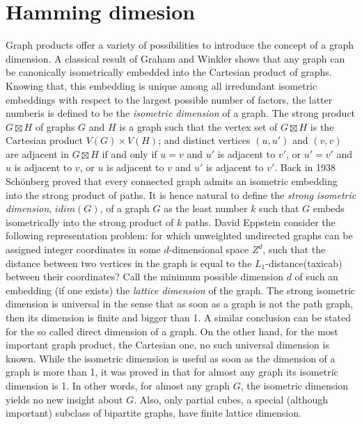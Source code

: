 \documentclass[12pt,a4paper,titlepage,openany]{report}
\begin{document}
\chapter{Hamming dimesion}
Graph products offer a variety of possibilities to introduce the concept of a graph dimension. A classical result of Graham and Winkler \cite{Graham} shows that any graph can be canonically isometrically embedded into the Cartesian product of graphs. Knowing that, this embedding is unique among all irredundant isometric embeddings with respect to the largest possible number of factors, the latter numberis is defined to be the \textit{isometric dimension} of a graph. 
\newline The strong product $G\boxtimes H$ of graphs $G$ and $H$ is a graph such that the vertex set of $G\boxtimes H$ is the Cartesian product $V(G) \times V(H)$; and distinct vertices $(u,u')$ and $(v,v)$ are adjacent in $G\boxtimes  H$ if and only if $u = v$ and $u'$ is adjacent to $v'$, or $u' = v'$ and $u$ is adjacent to $v$, or $u$ is adjacent to $v$ and $u'$ is adjacent to $v'$. Back in 1938 Sch\" onberg \cite{Schonber} proved that every connected graph admits an isometric embedding into the strong product of paths. It is hence natural to define the \textit{strong isometric dimension}, $idim(G)$, of a graph $G$ as the least number $k$ such that $G$ embeds isometrically into the strong product of $k$ paths.\newline
David Eppstein consider the following representation problem: for which unweighted undirected graphs can be assigned integer coordinates in some $d$-dimensional space $Z^d$, such that the distance between two vertices in the graph is equal to the $L_1$-distance(taxicab) between their coordinates? Call the minimum possible dimension $d$ of such an embedding (if one exists) the \textit{lattice dimension} of the graph.\newline
The strong isometric dimension is universal in the sense that as soon as a graph is not the path graph, then its dimension is finite and bigger than 1. A similar conclusion can be stated for the so called direct dimension of a graph. On the other hand, for the most important graph product, the Cartesian one, no such universal dimension is known. While the isometric dimension is useful as soon as the dimension of a graph is more than 1, it was proved in \cite{Poljak} that for almost any graph its isometric dimension is 1. In
other words, for almost any graph $G$, the isometric dimension yields no new insight about $G$. Also, only
partial cubes, a special (although important) subclass of bipartite graphs, have finite lattice dimension.\newline
\end{document}
